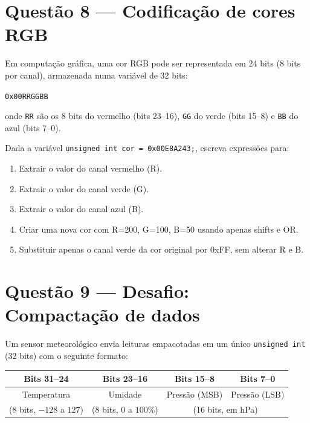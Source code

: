 \documentclass[12pt,a4paper]{article}
\begin{document}
\section{Questão 8 --- Codificação de cores RGB}

Em computação gráfica, uma cor RGB pode ser representada em 24 bits (8 bits por canal), armazenada numa variável de 32 bits:

\begin{center}
\texttt{0x00RRGGBB}
\end{center}

onde \texttt{RR} são os 8 bits do vermelho (bits 23--16), \texttt{GG} do verde (bits 15--8) e \texttt{BB} do azul (bits 7--0).

Dada a variável \texttt{unsigned int cor = 0x00E8A243;}, escreva expressões para:

\begin{enumerate}[label=\alph*)]
  \item Extrair o valor do canal vermelho (R).
  \item Extrair o valor do canal verde (G).
  \item Extrair o valor do canal azul (B).
  \item Criar uma nova cor com R=200, G=100, B=50 usando apenas shifts e OR.
  \item Substituir apenas o canal verde da cor original por 0xFF, sem alterar R e B.
\end{enumerate}

\section{Questão 9 --- Desafio: Compactação de dados}

Um sensor meteorológico envia leituras empacotadas em um único \texttt{unsigned int} (32 bits) com o seguinte formato:

\begin{center}
\small
\begin{tabular}{cccc}
\toprule
Bits 31--24 & Bits 23--16 & Bits 15--8 & Bits 7--0 \\
\midrule
Temperatura & Umidade & Pressão (MSB) & Pressão (LSB) \\
(8 bits, $-128$ a $127$) & (8 bits, $0$ a $100$\%) & \multicolumn{2}{c}{(16 bits, em hPa)} \\
\bottomrule
\end{tabular}
\end{center}
\end{document}
